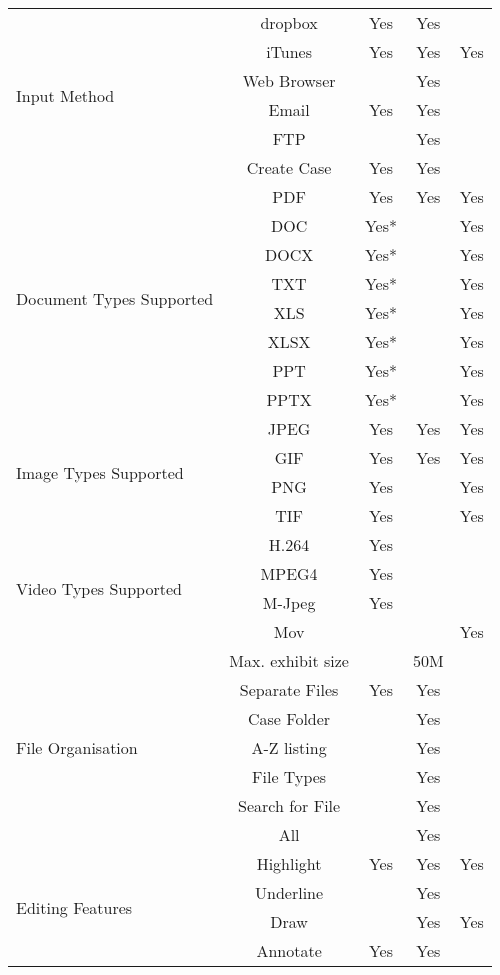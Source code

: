 \begin{center}
\begin{table}[h!]
\begin{tabular}{|l| c|| c| c| c |}
\hline
\multirow{6}{*}{Input Method} & dropbox & Yes & Yes & \\
\cline{2-5}
& iTunes & Yes&Yes&Yes \\ 
\cline{2-5}
& Web Browser & &Yes& \\
\cline{2-5}
&Email&Yes&Yes&\\
\cline{2-5}
&FTP&&Yes&\\
\cline{2-5}
&Create Case&Yes&Yes&\\
\hline
\multirow{8}{*}{Document Types Supported} & PDF & Yes & Yes &Yes \\
\cline{2-5}
 &DOC&Yes*&&Yes\\
 \cline{2-5}
 &DOCX&Yes*&&Yes\\
 \cline{2-5}
 &TXT&Yes*&&Yes\\
 \cline{2-5}
 &XLS&Yes*&&Yes\\
 \cline{2-5}
 &XLSX&Yes*&&Yes\\
 \cline{2-5}
 &PPT&Yes*&&Yes\\
 \cline{2-5}
 &PPTX&Yes*&&Yes\\
\hline
\multirow{4}{*}{Image Types Supported} & JPEG & Yes & Yes &Yes \\
\cline{2-5}
 &GIF & Yes & Yes &Yes \\
 \cline{2-5}
 &PNG & Yes &  &Yes \\
 \cline{2-5}
 &TIF & Yes &  &Yes \\
\hline
\multirow{4}{*}{Video Types Supported} & H.264 & Yes&& \\
\cline{2-5}
 &MPEG4&Yes&&\\
 \cline{2-5}
 &M-Jpeg&Yes&&\\
 \cline{2-5}
 &Mov&&&Yes\\
\hline
\multirow{7}{*}{File Organisation} & Max. exhibit size & &50M& \\
\cline{2-5}
&Separate Files&Yes&Yes&\\
\cline{2-5}
&Case Folder&&Yes&\\
\cline{2-5}
&A-Z listing&&Yes&\\
\cline{2-5}
&File Types&&Yes&\\
\cline{2-5}
&Search for File&&Yes&\\
\cline{2-5}
&All&&Yes&\\
\hline
\multirow{9}{*}{Editing Features} & Highlight  &Yes &Yes&Yes \\
\cline{2-5}
 & Underline&&Yes&\\
 \cline{2-5}
 &Draw&&Yes&Yes\\
 \cline{2-5}
 &Annotate&Yes&Yes&\\

\end{tabular}
\end{table}
\end{center}
